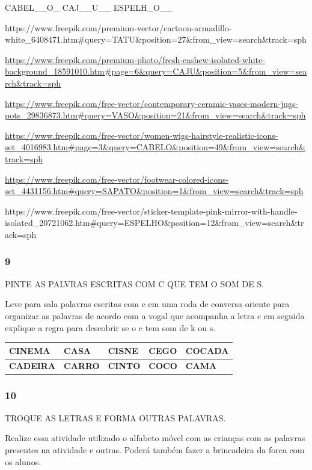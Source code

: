 CABEL\_\_O\_ CAJ\_\_U\_\_ ESPELH\_O\_\_

https://www.freepik.com/premium-vector/cartoon-armadillo-white\_6408471.htm\#query=TATU\&position=27\&from\_view=search\&track=sph

\url{https://www.freepik.com/premium-photo/fresh-cashew-isolated-white-background_18591010.htm\#page=6\&query=CAJU\&position=5\&from_view=search\&track=sph}

\url{https://www.freepik.com/free-vector/contemporary-ceramic-vases-modern-jugs-pots_29836873.htm\#query=VASO\&position=21\&from_view=search\&track=sph}

\url{https://www.freepik.com/free-vector/women-wigs-hairstyle-realistic-icons-set_4016983.htm\#page=3\&query=CABELO\&position=49\&from_view=search\&track=sph}

\url{https://www.freepik.com/free-vector/footwear-colored-icons-set_4431156.htm\#query=SAPATO\&position=1\&from_view=search\&track=sph}

https://www.freepik.com/free-vector/sticker-template-pink-mirror-with-handle-isolated\_20721062.htm\#query=ESPELHO\&position=12\&from\_view=search\&track=sph

\subsubsection{9 }\label{section-8}

PINTE AS PALVRAS ESCRITAS COM C QUE TEM O SOM DE S.

Leve para sala palavras escritas com c em uma roda de conversa oriente
para organizar as palavras de acordo com a vogal que acompanha a letra c
em seguida explique a regra para descobrir se o c tem som de k ou s.

\begin{longtable}[]{@{}lllll@{}}
\toprule
\textbf{CINEMA} & \textbf{CASA} & \textbf{CISNE} & \textbf{CEGO} &
\textbf{COCADA}\tabularnewline
\midrule
\endhead
\textbf{CADEIRA} & \textbf{CARRO} & \textbf{CINTO } & \textbf{COCO} &
\textbf{CAMA}\tabularnewline
\bottomrule
\end{longtable}

\subsubsection{10 }\label{section-9}

TROQUE AS LETRAS E FORMA OUTRAS PALAVRAS.

Realize essa atividade utilizado o alfabeto móvel com as crianças com as
palavras presentes na atividade e outras. Poderá também fazer a
brincadeira da forca com os alunos.

